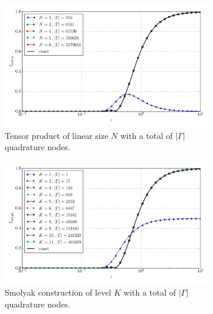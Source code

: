 \documentclass[a4paper,10pt]{article}
\begin{document}
\begin{figure}[ht!]
  \begin{subfigure}[t]{0.5\linewidth}
    \includegraphics[width=\linewidth]{./plots/tp_sg_8d_conv_eps_(2,0,0,0,0,0,0,0)_(2,0,0,0,0,0,0,0)_val_nsd_tp.pdf}
    \caption{Tensor product of linear size $N$ with a total of $|\Gamma|$ quadrature nodes.}
    \label{fig:tp_sg_8d_conv_eps_20000000_20000000_val_nsd_tp}
  \end{subfigure}
  \begin{subfigure}[t]{0.5\linewidth}
    \includegraphics[width=\linewidth]{./plots/tp_sg_8d_conv_eps_(2,0,0,0,0,0,0,0)_(2,0,0,0,0,0,0,0)_val_nsd_gk.pdf}
    \caption{Smolyak construction of level $K$ with a total of $|\Gamma|$ quadrature nodes.}
    \label{fig:tp_sg_8d_conv_eps_20000000_20000000_val_nsd_gk}
  \end{subfigure} \\
  \begin{subfigure}[t]{0.5\linewidth}

\end{subfigure}
\end{figure}
\end{document}
